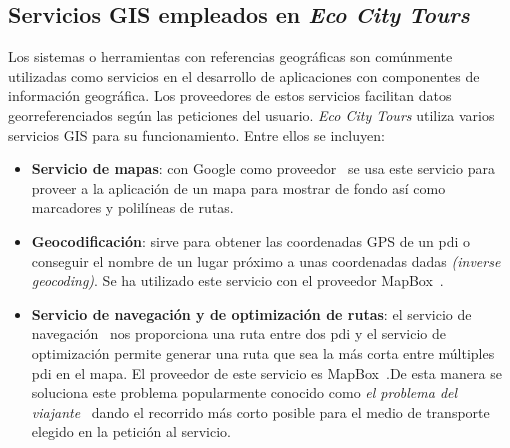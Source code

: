 	\subsection{Servicios GIS empleados en \textit{Eco City Tours}}
	Los sistemas o herramientas con referencias geográficas son comúnmente utilizadas como servicios en el desarrollo de aplicaciones con componentes de información geográfica. Los proveedores de estos servicios facilitan datos georreferenciados según las peticiones del usuario. \textit{Eco City Tours} utiliza varios servicios GIS para su funcionamiento. Entre ellos se incluyen:
	\begin{itemize}
		\item \textbf{Servicio de mapas}: con Google como proveedor~\cite{google_maps} se usa este servicio para proveer a la aplicación de un mapa para mostrar de fondo así como marcadores y polilíneas de rutas.
		
		\item \textbf{Geocodificación}: sirve para obtener las coordenadas GPS de un \acrlong{pdi} o conseguir el nombre de un lugar próximo a unas coordenadas dadas \textit{(inverse geocoding)}. Se ha utilizado este servicio con el proveedor MapBox~\cite{mapbox_geocoding}.
		
		\item \textbf{Servicio de navegación y de optimización de rutas}: el servicio de navegación~\cite{mapbox_directions} nos proporciona una ruta entre dos \acrlong{pdi} y el servicio de optimización permite generar una ruta que sea la más corta entre múltiples \acrshort{pdi} en el mapa. El proveedor de este servicio es MapBox~\cite{mapbox_optimization}.De esta manera se soluciona este problema popularmente conocido como \textit{el problema del viajante}~\cite{ubu_algoritmia} dando el recorrido más corto posible para el medio de transporte elegido en la petición al servicio.
		
	\end{itemize}
	
